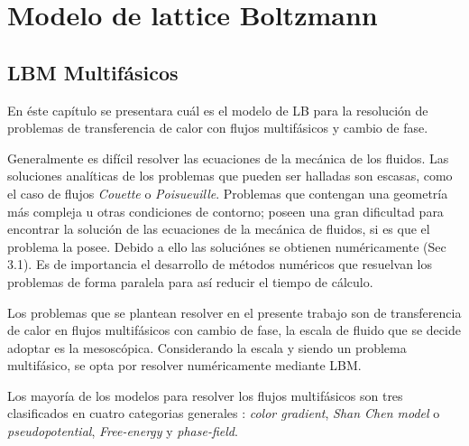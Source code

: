 \chapter{Modelo de lattice Boltzmann}

\graphicspath{{figs/cap2/}}
\label{cap2}

\section{LBM Multifásicos}

En éste capítulo se presentara cuál es el modelo de LB para la resolución de problemas de transferencia de calor con flujos multifásicos y cambio de fase.

Generalmente es difícil resolver las ecuaciones de la mecánica de los fluidos. Las soluciones analíticas de los problemas que pueden ser halladas son escasas, como el caso de flujos \textit{Couette} o \textit{Poisueuille}. Problemas que contengan una geometría más compleja u otras condiciones de contorno; poseen una gran dificultad para encontrar la solución de las ecuaciones de la mecánica de fluidos, si es que el problema la posee. Debido a ello las soluciónes se obtienen numéricamente \cite{kruger2017lattice}(Sec 3.1). Es de importancia el desarrollo de métodos numéricos que resuelvan los problemas de forma paralela para así reducir el tiempo de cálculo.

Los problemas que se plantean resolver en el presente trabajo son de transferencia de calor en flujos multifásicos con cambio de fase, la escala de fluido que se decide adoptar es la mesoscópica. Considerando la escala y siendo un problema multifásico, se opta por resolver numéricamente mediante LBM. 


Los mayoría de los modelos para resolver los flujos multifásicos son tres clasificados en cuatro categorias generales : \textit{color gradient}, \textit{Shan Chen model} o \textit{pseudopotential}, \textit{Free-energy} y  \textit{phase-field}. 



